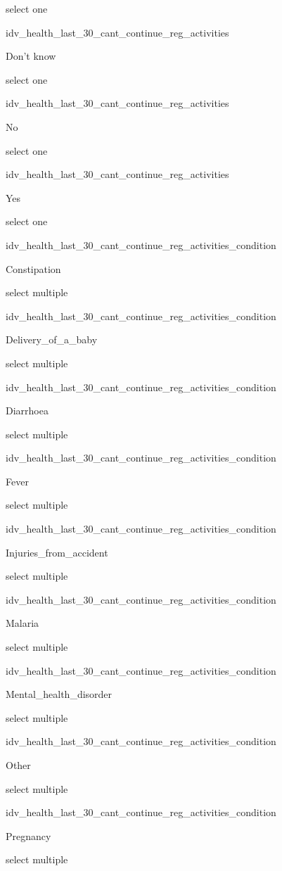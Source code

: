\documentclass[]{article}
\begin{document}
select one

idv\_health\_last\_30\_cant\_continue\_reg\_activities

Don't know

select one

idv\_health\_last\_30\_cant\_continue\_reg\_activities

No

select one

idv\_health\_last\_30\_cant\_continue\_reg\_activities

Yes

select one

idv\_health\_last\_30\_cant\_continue\_reg\_activities\_condition

Constipation

select multiple

idv\_health\_last\_30\_cant\_continue\_reg\_activities\_condition

Delivery\_of\_a\_baby

select multiple

idv\_health\_last\_30\_cant\_continue\_reg\_activities\_condition

Diarrhoea

select multiple

idv\_health\_last\_30\_cant\_continue\_reg\_activities\_condition

Fever

select multiple

idv\_health\_last\_30\_cant\_continue\_reg\_activities\_condition

Injuries\_from\_accident

select multiple

idv\_health\_last\_30\_cant\_continue\_reg\_activities\_condition

Malaria

select multiple

idv\_health\_last\_30\_cant\_continue\_reg\_activities\_condition

Mental\_health\_disorder

select multiple

idv\_health\_last\_30\_cant\_continue\_reg\_activities\_condition

Other

select multiple

idv\_health\_last\_30\_cant\_continue\_reg\_activities\_condition

Pregnancy

select multiple
\end{document}
